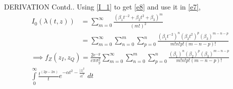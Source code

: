 \documentclass{beamer}
\providecommand{\brak}[1]{\ensuremath{\left(#1\right)}}
\begin{document}
\begin{frame}{DERIVATION Contd..}
    Using \eqref{I_1} to get \eqref{e8} and use it in \eqref{e7},
    \begin{align}
        I_0(\lambda(t,z))&=\sum\limits_{m=0}^{\infty}\frac{({\beta_1 t^{-2}+\beta_2 t^2+ \beta_3})^m}{(m!)^2}\\
        &=\sum\limits_{m=0}^{\infty}\sum\limits_{n=0}^{m}\sum\limits_{p=0}^{n}\frac{(\beta_1 t^{-2})^n(\beta_2 t^{2})^p(\beta_3)^{m-n-p}}{m!n!p!(m-n-p)!}\label{e8}
    \end{align}
    \begin{multline}
       \implies f_{Z}\brak{z_I,z_Q} =\frac{2e^{-g}}{c\pi\sigma_y^2}\sum\limits_{m=0}^{\infty}\sum\limits_{n=0}^{m}\sum\limits_{p=0}^{n}\frac{(\beta_1)^n(\beta_2 )^p(\beta_3)^{m-n-p}}{m!n!p!(m-n-p)!}\\\int\limits_{0}^{\infty}\frac{t^{(2p-2n)}}{t}e^{-\alpha t^2-\frac{|z|^2}{ct^2}}\;dt\label{e9}
    \end{multline}
\end{frame}
\end{document}
